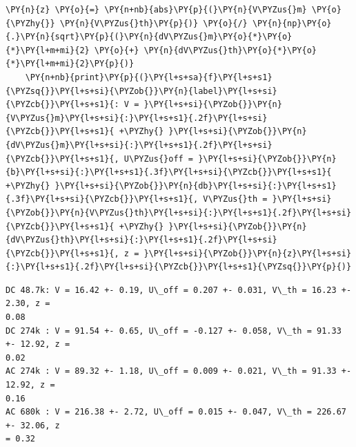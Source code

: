 \begin{tcolorbox}[breakable, size=fbox, boxrule=1pt, pad at break*=1mm,colback=cellbackground, colframe=cellborder]
\begin{Verbatim}[commandchars=\\\{\}]
    \PY{n}{z} \PY{o}{=} \PY{n+nb}{abs}\PY{p}{(}\PY{n}{V\PYZus{}m} \PY{o}{\PYZhy{}} \PY{n}{V\PYZus{}th}\PY{p}{)} \PY{o}{/} \PY{n}{np}\PY{o}{.}\PY{n}{sqrt}\PY{p}{(}\PY{n}{dV\PYZus{}m}\PY{o}{*}\PY{o}{*}\PY{l+m+mi}{2} \PY{o}{+} \PY{n}{dV\PYZus{}th}\PY{o}{*}\PY{o}{*}\PY{l+m+mi}{2}\PY{p}{)}
    \PY{n+nb}{print}\PY{p}{(}\PY{l+s+sa}{f}\PY{l+s+s1}{\PYZsq{}}\PY{l+s+si}{\PYZob{}}\PY{n}{label}\PY{l+s+si}{\PYZcb{}}\PY{l+s+s1}{: V = }\PY{l+s+si}{\PYZob{}}\PY{n}{V\PYZus{}m}\PY{l+s+si}{:}\PY{l+s+s1}{.2f}\PY{l+s+si}{\PYZcb{}}\PY{l+s+s1}{ +\PYZhy{} }\PY{l+s+si}{\PYZob{}}\PY{n}{dV\PYZus{}m}\PY{l+s+si}{:}\PY{l+s+s1}{.2f}\PY{l+s+si}{\PYZcb{}}\PY{l+s+s1}{, U\PYZus{}off = }\PY{l+s+si}{\PYZob{}}\PY{n}{b}\PY{l+s+si}{:}\PY{l+s+s1}{.3f}\PY{l+s+si}{\PYZcb{}}\PY{l+s+s1}{ +\PYZhy{} }\PY{l+s+si}{\PYZob{}}\PY{n}{db}\PY{l+s+si}{:}\PY{l+s+s1}{.3f}\PY{l+s+si}{\PYZcb{}}\PY{l+s+s1}{, V\PYZus{}th = }\PY{l+s+si}{\PYZob{}}\PY{n}{V\PYZus{}th}\PY{l+s+si}{:}\PY{l+s+s1}{.2f}\PY{l+s+si}{\PYZcb{}}\PY{l+s+s1}{ +\PYZhy{} }\PY{l+s+si}{\PYZob{}}\PY{n}{dV\PYZus{}th}\PY{l+s+si}{:}\PY{l+s+s1}{.2f}\PY{l+s+si}{\PYZcb{}}\PY{l+s+s1}{, z = }\PY{l+s+si}{\PYZob{}}\PY{n}{z}\PY{l+s+si}{:}\PY{l+s+s1}{.2f}\PY{l+s+si}{\PYZcb{}}\PY{l+s+s1}{\PYZsq{}}\PY{p}{)}
\end{Verbatim}
\end{tcolorbox}

    \begin{Verbatim}[commandchars=\\\{\}]
DC 48.7k: V = 16.42 +- 0.19, U\_off = 0.207 +- 0.031, V\_th = 16.23 +- 2.30, z =
0.08
DC 274k : V = 91.54 +- 0.65, U\_off = -0.127 +- 0.058, V\_th = 91.33 +- 12.92, z =
0.02
AC 274k : V = 89.32 +- 1.18, U\_off = 0.009 +- 0.021, V\_th = 91.33 +- 12.92, z =
0.16
AC 680k : V = 216.38 +- 2.72, U\_off = 0.015 +- 0.047, V\_th = 226.67 +- 32.06, z
= 0.32
    \end{Verbatim}

